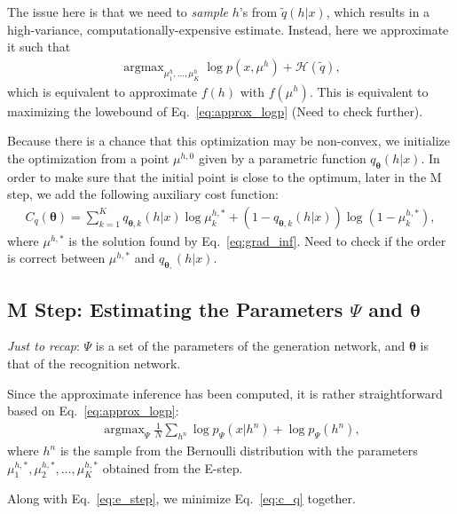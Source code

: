 \documentclass{article}
\newcommand{\vects}[1]{\boldsymbol{#1}}
\newcommand{\TT}[0]{\vects{\theta}}
\newcommand{\HH}[0]{\mathcal{H}}
\DeclareMathOperator*{\argmax}{\arg \max}
\begin{document}
The issue here is that we need to {\em sample} $h$'s from $\tilde{q}(h|x)$,
which results in a high-variance, computationally-expensive estimate. Instead,
here we approximate it such that
\begin{align}
    \label{eq:grad_inf}
    \argmax_{\mu^h_1, \ldots, \mu^h_K} 
    \log p(x,\mu^h) + \HH(\tilde{q}),
\end{align}
which is equivalent to approximate $f(h)$ with $f(\mu^h)$. {\color{red} This is equivalent to
maximizing the lowebound of Eq.~\eqref{eq:approx_logp} (Need to check further)}.

Because there is a chance that this optimization may be non-convex, we
initialize the optimization from a point $\mu^{h,0}$ given by a parametric
function $q_{\TT}(h|x)$. In order to make sure that the initial point is close
to the optimum, later in the M step, we add the following auxiliary cost
function:
\begin{align}
    \label{eq:c_q}
    C_q(\TT) = \sum_{k=1}^K q_{\TT,k}(h|x) \log \mu^{h,*}_k + 
    (1 - q_{\TT,k}(h|x)) \log (1 - \mu^{h,*}_k),
\end{align}
where $\mu^{h,*}$ is the solution found by Eq.~\eqref{eq:grad_inf}. {\color{red}
    Need to check if the order is correct between $\mu^{h,*}$ and
$q_{\TT,}(h|x)$.}

\subsection{M Step: Estimating the Parameters $\Psi$ and $\TT$}

{\em Just to recap}: $\Psi$ is a set of the parameters of the generation
network, and $\TT$ is that of the recognition network.

Since the approximate inference has been computed, it is rather straightforward
based on Eq.~\eqref{eq:approx_logp}:
\begin{align}
    \label{eq:e_step}
    \argmax_{\Psi} \frac{1}{N} \sum_{h^n} \log p_{\Psi}(x| h^n) + \log p_{\Psi}(h^n),
\end{align}
where $h^n$ is the sample from the Bernoulli distribution with the parameters
$\mu^{h,*}_1, \mu^{h,*}_2, \ldots, \mu^{h,*}_K$ obtained from the E-step.

Along with Eq.~\eqref{eq:e_step}, we minimize Eq.~\eqref{eq:c_q} together.











%
%
\end{document}
